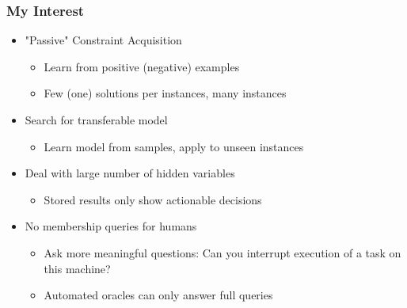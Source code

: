 \documentclass[dvipsnames,aspectratio=169]{beamer}
\begin{document}
\begin{frame}
\frametitle{My Interest}
\begin{itemize}
\item "Passive" Constraint Acquisition
\begin{itemize}
\item Learn from positive (negative) examples
\item Few (one) solutions per instances, many instances
\end{itemize}
\item Search for transferable model
\begin{itemize}
\item Learn model from samples, apply to unseen instances
\end{itemize}
\item Deal with large number of hidden variables
\begin{itemize}
\item Stored results only show actionable decisions
\end{itemize}
\item No membership queries for humans
\begin{itemize}
\item Ask more meaningful questions: Can you interrupt execution of a task on this machine?
\item Automated oracles can only answer full queries
\end{itemize}
\end{itemize}
\end{frame}






\end{document}
